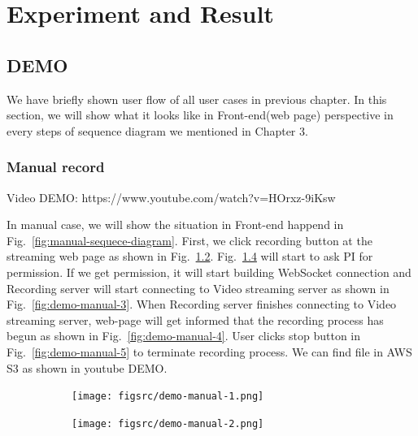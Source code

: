 \chapter{Experiment and Result}
\label{c:Experiment-and-Result}





\graphicspath{{./figsrc/}}
\fi

\section{DEMO}
We have briefly shown user flow of all user cases in previous chapter. In this section, we will show what it looks like in Front-end(web page) perspective in every steps of sequence diagram we mentioned in Chapter 3.

\subsection{Manual record}
Video DEMO: https://www.youtube.com/watch?v=HOrxz-9iKsw
 
In manual case, we will show the situation in Front-end happend in Fig.~\ref{fig:manual-sequece-diagram}. First, we click recording button at the streaming web page as shown in Fig.~\ref{fig:demo-manual-1}. Fig.~\ref{fig:demo-manual-2} will start to ask PI for permission. If we get permission, it will start building WebSocket connection and Recording server will start connecting to Video streaming server as shown in Fig.~\ref{fig:demo-manual-3}. When Recording server finishes connecting to Video streaming server, web-page will get informed that the recording process has begun as shown in Fig.~\ref{fig:demo-manual-4}. User clicks stop button in Fig.~\ref{fig:demo-manual-5} to terminate recording process. We can find file in AWS S3 as shown in youtube DEMO.

\begin{figure}[H]
    \ContinuedFloat
    \centering
    \begin{subfigure}{\textwidth}
        \texttt{[image: figsrc/demo-manual-1.png]}
        \label{fig:demo-manual-1}
    \end{subfigure}
\end{figure}

\begin{figure}[H]
    \ContinuedFloat
    \centering
    \begin{subfigure}{\textwidth}
        \texttt{[image: figsrc/demo-manual-2.png]}
        \label{fig:demo-manual-2}
    \end{subfigure}
\end{figure}

